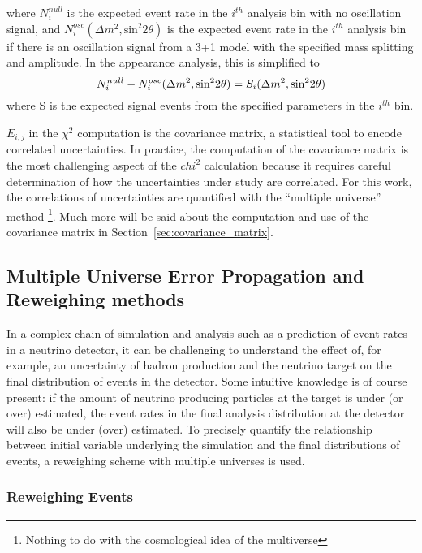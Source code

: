 where $N^{null}_i$ is the expected event rate in the $i^{th}$ analysis bin with no oscillation signal, and $N^{osc}_i(\Delta m^2, \text{sin}^2 2 \theta )$ is the expected event rate in the $i^{th}$ analysis bin if there is an oscillation signal from a 3+1 model with the specified mass splitting and amplitude.  In the \nue appearance analysis, this is simplified to 
\begin{equation}
\begin{centering}
N^{null}_i - N^{osc}_i(\Delta m^2, \text{sin}^2 2 \theta ) = S_i(\Delta m^2, \text{sin}^2 2 \theta )
\end{centering}
\end{equation}
where S is the expected signal events from the specified parameters in the $i^{th}$ bin.

$E_{i,j}$ in the $\chi^2$ computation is the covariance matrix, a statistical tool to encode correlated uncertainties.  In practice, the computation of the covariance matrix is the most challenging aspect of the $chi^2$ calculation because it requires careful determination of how the uncertainties under study are correlated.  For this work, the correlations of uncertainties are quantified with the ``multiple universe'' method \footnote{Nothing to do with the cosmological idea of the multiverse}.  Much more will be said about the computation and use of the covariance matrix in Section~\ref{sec:covariance_matrix}.

\subsection{Multiple Universe Error Propagation and Reweighing methods}

In a complex chain of simulation and analysis such as a prediction of event rates in a neutrino detector, it can be challenging to understand the effect of, for example, an uncertainty of hadron production and the neutrino target on the final distribution of events in the detector.  Some intuitive knowledge is of course present: if the amount of neutrino producing particles at the target is under (or over) estimated, the event rates in the final analysis distribution at the detector will also be under (over) estimated.  To precisely quantify the relationship between initial variable underlying the simulation and the final distributions of events, a reweighing scheme with multiple universes is used.

\subsubsection{Reweighing Events}

